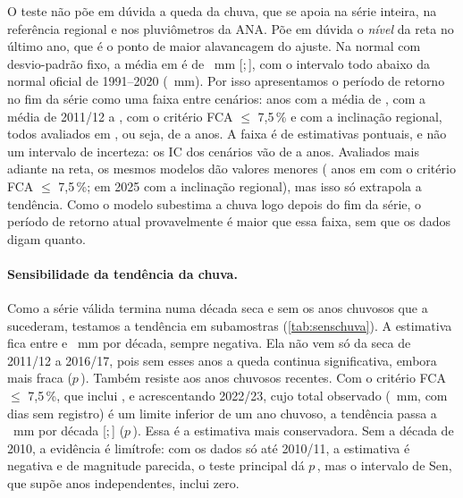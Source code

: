 \documentclass[11pt,a4paper]{article}
\newcommand{\IC}[2]{[#1;\,#2]}            %
\begin{document}
O teste não põe em dúvida a queda da chuva, que se apoia na série inteira, na referência regional
e nos pluviômetros da ANA. Põe em dúvida o \emph{nível} da reta no último ano, que é o ponto de
maior alavancagem do ajuste. Na normal com desvio-padrão fixo, a média em \UltimoAnoNS{} é de
\MediaNormalUlt{}~mm \IC{\MediaNormalUltICinf}{\MediaNormalUltICsup}, com o intervalo todo abaixo
da normal oficial de 1991--2020 (\NormalOficialChuva{}~mm). Por isso apresentamos o período de
retorno no fim da série como uma faixa entre cenários: \TNSMediaUlt{} anos com a média de
\UltimoAnoNS{}, \TNSMediaDecada{} com a média de 2011/12 a \UltimoAnoNS{}, \TNSMediaFCASeteUltStd{}
com o critério FCA $\le$ 7,5\,\% e \TRegionalMediaUltB{} com a inclinação regional, todos avaliados
em \UltimoAnoNS{}, ou seja, de \TNSFaixaMin{} a \TNSFaixaMax{} anos. A faixa é de estimativas
pontuais, e não um intervalo de incerteza: os IC dos cenários vão de \TNSMediaUltICinf{} a
\TRegionalMediaUltBICsup{} anos. Avaliados mais adiante na
reta, os mesmos modelos dão valores menores (\TNSMediaFCASeteUlt{} anos em \UltimoAnoFCASete{} com o
critério FCA $\le$ 7,5\,\%; \TRegionalMedia{} em 2025 com a inclinação regional), mas isso só
extrapola a tendência. Como o modelo subestima a chuva logo depois do fim da série,
o período de retorno atual provavelmente é maior que essa faixa, sem que os dados digam quanto.

\paragraph{Sensibilidade da tendência da chuva.} Como a série válida termina numa década seca e
sem os anos chuvosos que a sucederam, testamos a tendência em subamostras (\cref{tab:senschuva}).
A estimativa fica entre \SenChuvaRecentes{} e \SenChuvaDesdeSetentaUm{}~mm por década, sempre
negativa. Ela não vem só da seca de 2011/12 a 2016/17, pois sem esses anos a queda continua
significativa, embora mais fraca ($p$\,\PTFPWChuvaSemSeca). Também resiste aos anos chuvosos
recentes. Com o critério FCA $\le$ 7,5\,\%, que inclui \AnosFCASete{}, e acrescentando 2022/23, cujo
total observado (\ChuvaObsVinteDois{}~mm, com \DiasAusVinteDois{} dias sem registro) é um limite
inferior de um ano chuvoso, a tendência passa a \SenChuvaRecentes{}~mm por década
\IC{\SenChuvaRecentesICinf}{\SenChuvaRecentesICsup} ($p$\,\PTFPWChuvaRecentes). Essa é a estimativa
mais conservadora. Sem a década de 2010, a evidência é limítrofe: com os dados só até 2010/11, a
estimativa é negativa e de magnitude parecida, o teste principal dá $p$\,\PTFPWChuvaAteDezOnze, mas o
intervalo de Sen, que supõe anos independentes, inclui zero.
\end{document}
